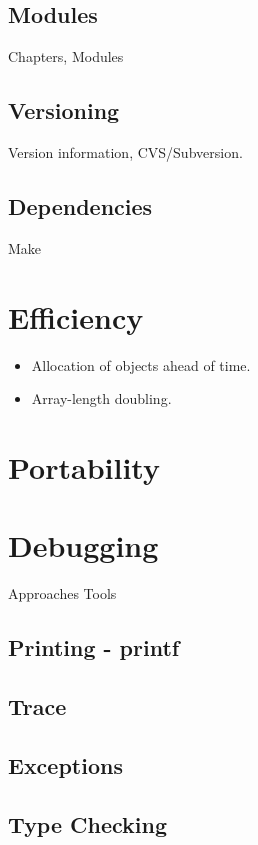  \subsection{Modules}
   Chapters, Modules

 \subsection{Versioning}
   Version information, CVS/Subversion.

 \subsection{Dependencies} 
  Make
 
\section{Efficiency}

\begin{itemize}
  \item  Allocation of objects ahead of time.
  \item  Array-length doubling.
\end{itemize}

\section{Portability}

\section{Debugging}
 Approaches
  Tools
  \subsection{Printing - printf}
  \subsection{Trace}
  \subsection{Exceptions}
  \subsection{Type Checking}

